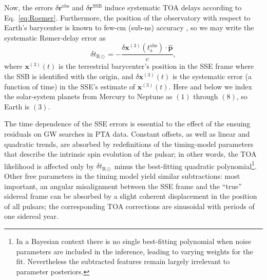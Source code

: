 \documentclass[iop,apj,twocolappendix]{emulateapj}
\begin{document}
Now, the errors $\delta \mathbf{r}^\mathrm{obs}$ and $\delta \mathbf{r}^\mathrm{SSB}$ induce systematic TOA delays according to Eq.\ \eqref{eq:Roemer}.
Furthermore, the position of the observatory with respect to Earth's barycenter is known to few-cm (sub-ns) accuracy \citep{ehm06}, so we may write the systematic R{\o}mer-delay error as
%
\begin{equation}
\label{eq:deltar}
\delta t_{\mathrm{R}\odot} = -\frac{\delta \mathbf{x}^{(3)}(t_\mathrm{a}^\mathrm{obs})\cdot\hat{\mathbf{p}}}{c},
\end{equation}
%
where $\mathbf{x}^{(3)}(t)$ is the terrestrial barycenter's position in the SSE frame where the SSB is identified with the origin, and $\delta \mathbf{x}^{(3)}(t)$ is the systematic error (a function of time) in the SSE's estimate of $\mathbf{x}^{(3)}(t)$. Here and below we index the solar-system planets from Mercury to Neptune as $(1)$ through $(8)$, so Earth is $(3)$.

The time dependence of the SSE errors is essential to the effect of the ensuing residuals on GW searches in PTA data. Constant offsets, as well as linear and quadratic trends, are absorbed by redefinitions of the timing-model parameters that describe the intrinsic spin evolution of the pulsar; in other words, the TOA likelihood is affected only by $\delta t_{\mathrm{R}\odot}$ minus the best-fitting quadratic polynomial\footnote{In a Bayesian context there is no single best-fitting polynomial when noise parameters are included in the inference, leading to varying weights for the fit. Nevertheless the subtracted features remain largely irrelevant to parameter posteriors.}. Other free parameters in the timing model yield similar subtractions: most important, an angular misalignment between the SSE frame and the ``true'' sidereal frame can be absorbed by a slight coherent displacement in the position of all pulsars; the corresponding TOA corrections are sinusoidal with periods of one sidereal year.
\end{document}
